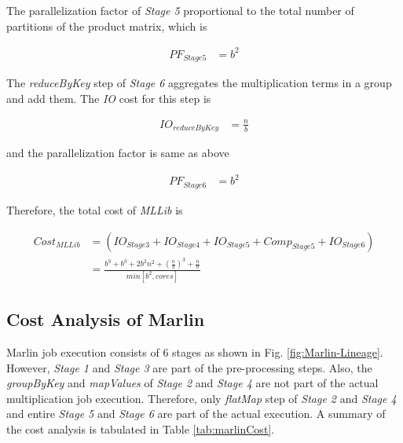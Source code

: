 The parallelization factor of \textit{Stage 5} proportional to the total number of partitions of the product matrix, which is

\begin{equation}
\begin{aligned}
PF_{Stage5}&=b^{2}
\end{aligned}
\end{equation}

The \textit{reduceByKey} step of \textit{Stage 6} aggregates the multiplication terms in a group and add them. The \textit{IO} cost for this step is

\begin{equation}
\begin{aligned}
IO_{reduceByKey}&=\frac{n}{b}
\end{aligned}
\end{equation}

and the parallelization factor is same as above

\begin{equation}
\begin{aligned}
PF_{Stage6}&=b^{2}
\end{aligned}
\end{equation}

Therefore, the total cost of \textit{MLLib} is

\begin{equation}
\begin{aligned}
Cost_{MLLib}&=(IO_{Stage3}+IO_{Stage4}+IO_{Stage5}+Comp_{Stage5}+IO_{Stage6}) \\
&=\frac{b^{3}+b^{3}+2b^{2}n^{2}+(\frac{n}{b})^{3}+\frac{n}{b}}{min[b^{2}, cores]}
\end{aligned}
\end{equation}


\subsection{Cost Analysis of Marlin}
Marlin job execution consists of $6$ stages as shown in Fig. \ref{fig:Marlin-Lineage}. However, \textit{Stage 1} and \textit{Stage 3} are part of the pre-processing steps. Also, the \textit{groupByKey} and \textit{mapValues} of \textit{Stage 2} and \textit{Stage 4} are not part of the actual multiplication job execution. Therefore, only \textit{flatMap} step of \textit{Stage 2} and \textit{Stage 4} and entire \textit{Stage 5} and \textit{Stage 6} are part of the actual execution.
A summary of the cost analysis is tabulated in Table \ref{tab:marlinCost}.

